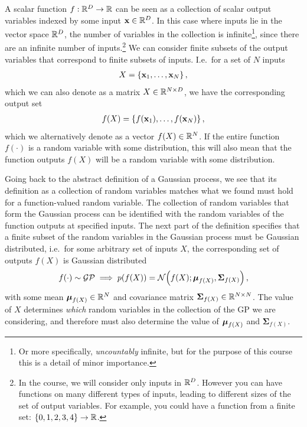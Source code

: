 \documentclass[a4paper]{article}
\theoremstyle{definition}
\begin{document}
A scalar function $f: \mathbb{R}^D\to \mathbb{R}$ can be seen as a collection of scalar output variables indexed by some input $\mathbf{x} \in \mathbb{R}^D$. In this case where inputs lie in the vector space $\mathbb{R}^D$, the number of variables in the collection is infinite\footnote{Or more specifically, \emph{uncountably} infinite, but for the purpose of this course this is a detail of minor importance.}, since there are an infinite number of inputs.\footnote{In the course, we will consider only inputs in $\mathbb{R}^D$. However you can have functions on many different types of inputs, leading to different sizes of the set of output variables. For example, you could have a function from a finite set: $\{0, 1, 2, 3, 4\} \to \mathbb{R}$.} We can consider finite subsets of the output variables that correspond to finite subsets of inputs. I.e.~for a set of $N$ inputs
\begin{align}
X = \{\mathbf{x}_1, \dots, \mathbf{x}_N\} \,,
\end{align}
which we can also denote as a matrix $X \in \mathbb{R}^{N\times D}$, we have the corresponding output set
\begin{align}
f(X) = \{f(\mathbf{x}_1), \dots, f(\mathbf{x}_N)\} \,,
\end{align}
which we alternatively denote as a vector $f(X) \in \mathbb{R}^N$. If the entire function $f(\cdot)$ is a random variable with some distribution, this will also mean that the function outputs $f(X)$ will be a random variable with some distribution.

Going back to the abstract definition of a Gaussian process, we see that its definition as a collection of random variables matches what we found must hold for a function-valued random variable. The collection of random variables that form the Gaussian process can be identified with the random variables of the function outputs at specified inputs. The next part of the definition specifies that a finite subset of the random variables in the Gaussian process must be Gaussian distributed, i.e.~for some arbitrary set of inputs $X$, the corresponding set of outputs $f(X)$ is Gaussian distributed
\begin{align}
f(\cdot) \sim \mathcal{GP} \implies p(f(X)) = \NormDist{f(X); \vmu_{f(X)}, \boldsymbol{\Sigma}_{f(X)}} \,,
\end{align}
with some mean $\boldsymbol{\mu}_{f(X)} \in \mathbb{R}^N$ and covariance matrix $\boldsymbol{\Sigma}_{f(X)} \in \mathbb{R}^{N\times N}$. The value of $X$ determines \emph{which} random variables in the collection of the GP we are considering, and therefore must also determine the value of $\boldsymbol{\mu}_{f(X)}$ and $\boldsymbol{\Sigma}_{f(X)}$.
\end{document}
